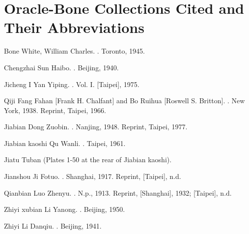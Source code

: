 \section*{Oracle-Bone Collections Cited and Their Abbreviations}

\newlength{\keightleyabbrevlabelwidth}
\begin{list}{}{%
  \setlength{\labelwidth}{\keightleyabbrevlabelwidth}%
  \setlength{\labelsep}{1em}%
  \setlength{\leftmargin}{\labelwidth}%
  \addtolength{\leftmargin}{\labelsep}%
  \setlength{\itemindent}{0pt}%
  \setlength{\itemsep}{0.5\baselineskip}%
  \setlength{\parsep}{0pt}%
  \setlength{\topsep}{0.5\baselineskip}%
  \renewcommand{\makelabel}[1]{\textbf{#1}\hfill}%
}
  \item[Bone] White, William Charles. . Toronto, 1945.
  \item[Chengzhai] Sun Haibo. . Beijing, 1940.
  \item[Jicheng I] Yan Yiping. . Vol. I. [Taipei], 1975.
  \item[Qiji] Fang Fahan [Frank H. Chalfant] and Bo Ruihua [Roswell S. Britton]. . New York, 1938. Reprint, Taipei, 1966.
  \item[Jiabian] Dong Zuobin. . Nanjing, 1948. Reprint, Taipei, 1977.
  \item[Jiabian kaoshi] Qu Wanli. . Taipei, 1961.
  \item[Jiatu] Tuban (Plates 1-50 at the rear of Jiabian kaoshi).
  \item[Jianshou] Ji Fotuo. . Shanghai, 1917. Reprint, [Taipei], n.d.
  \item[Qianbian] Luo Zhenyu. . N.p., 1913. Reprint, [Shanghai], 1932; [Taipei], n.d.
  \item[Zhiyi xubian] Li Yanong. . Beijing, 1950.
  \item[Zhiyi] Li Danqiu. . Beijing, 1941.

\end{list}
